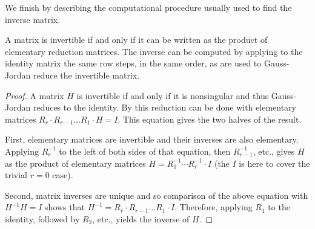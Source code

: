 We finish by describing the computational procedure
usually used to find the inverse matrix.

\begin{lemma} \label{lem:ComputeInvMat}
A matrix is invertible if and only if it can be written as the product of
elementary reduction matrices.
The inverse can be computed by applying to the 
identity matrix the same row steps, in the same order, as are used to
Gauss-Jordan reduce the invertible matrix. 
\end{lemma}

\begin{proof}
A matrix $H$ is invertible if and only if it is nonsingular and thus 
Gauss-Jordan reduces to the identity.
By  this reduction can
be done with elementary matrices 
\( R_r\cdot R_{r-1}\dots R_1\cdot H=I \).
This equation gives the two halves of the result.

First, elementary matrices are invertible and their inverses are also
elementary.
Applying $R_r^{-1}$ to the left of both sides of that equation, then
$R_{r-1}^{-1}$, etc., gives $H$ as the product of
elementary matrices $H=R_1^{-1}\cdots R_r^{-1}\cdot I$
(the $I$ is here to cover the trivial $r=0$ case).

Second, matrix inverses are unique and so comparison of the above
equation with $H^{-1}H=I$ shows that 
$H^{-1}=R_r\cdot R_{r-1}\dots R_1\cdot I$.
Therefore, applying $R_1$ to the identity, 
followed by $R_2$, etc., yields the inverse of $H$.
\end{proof}

